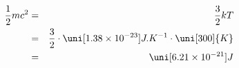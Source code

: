 \begin{eqnarray*}
\frac{1}{2}mc^2 &=& \frac{3}{2}kT \\
&=& \frac{3}{2} \cdot \uni[1.38 \times 10^{-23}]{J.K^{-1}} \cdot \uni[300]{K} \\
&=& \uni[6.21\times 10^{-21}]{J}
\label{}
\end{eqnarray*}